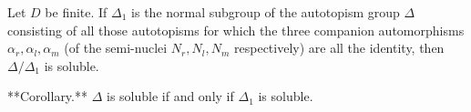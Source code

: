 Let $D$ be finite. If $\Delta_1$ is the normal subgroup of the autotopism group $\Delta$ consisting of all those autotopisms for which the three companion automorphisms $\alpha_r, \alpha_l, \alpha_m$ (of the semi-nuclei $N_r, N_l, N_m$ respectively) are all the identity, then $\Delta / \Delta_1$ is soluble.

**Corollary.** $\Delta$ is soluble if and only if $\Delta_1$ is soluble.
